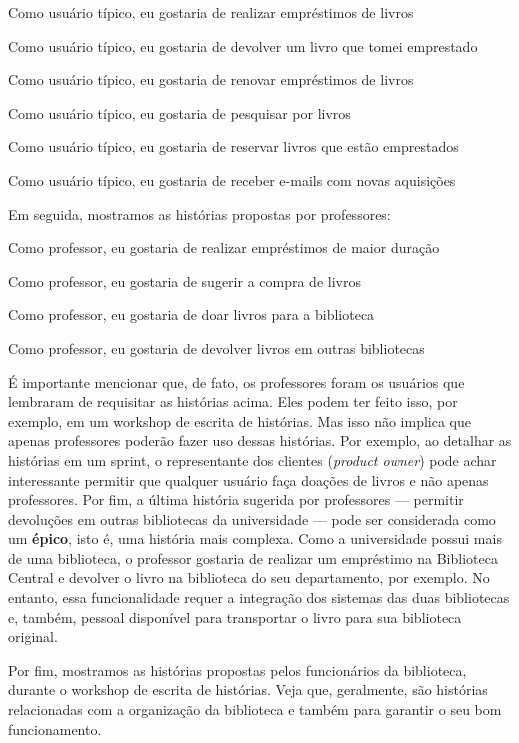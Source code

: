 \documentclass[
  11pt,
  twoside]{book}
\renewenvironment{quote}{\centering \vspace{1.5ex} \begin{tcolorbox}[colback=backcolor, width=4.9in]}{\end{tcolorbox}}
\begin{document}
\begin{quote}
Como usuário típico, eu gostaria de realizar empréstimos de livros

Como usuário típico, eu gostaria de devolver um livro que tomei
emprestado

Como usuário típico, eu gostaria de renovar empréstimos de livros

Como usuário típico, eu gostaria de pesquisar por livros

Como usuário típico, eu gostaria de reservar livros que estão
emprestados

Como usuário típico, eu gostaria de receber e-mails com novas aquisições
\end{quote}

Em seguida, mostramos as histórias propostas por professores:

\begin{quote}
Como professor, eu gostaria de realizar empréstimos de maior duração

Como professor, eu gostaria de sugerir a compra de livros

Como professor, eu gostaria de doar livros para a biblioteca

Como professor, eu gostaria de devolver livros em outras bibliotecas
\end{quote}

 É importante mencionar que, de fato,
os professores foram os usuários que lembraram de requisitar as
histórias acima. Eles podem ter feito isso, por exemplo, em um workshop
de escrita de histórias. Mas isso não implica que apenas professores
poderão fazer uso dessas histórias. Por exemplo, ao detalhar as
histórias em um sprint, o representante dos clientes (\emph{product
owner}) pode achar interessante permitir que qualquer usuário faça
doações de livros e não apenas professores. Por fim, a última história
sugerida por professores --- permitir devoluções em outras bibliotecas
da universidade --- pode ser considerada como um \textbf{épico}, isto é,
uma história mais complexa. Como a universidade possui mais de uma
biblioteca, o professor gostaria de realizar um empréstimo na Biblioteca
Central e devolver o livro na biblioteca do seu departamento, por
exemplo. No entanto, essa funcionalidade requer a integração dos
sistemas das duas bibliotecas e, também, pessoal disponível para
transportar o livro para sua biblioteca original.

Por fim, mostramos as histórias propostas pelos funcionários da
biblioteca, durante o workshop de escrita de histórias. Veja que,
geralmente, são histórias relacionadas com a organização da biblioteca e
também para garantir o seu bom funcionamento.
\end{document}
